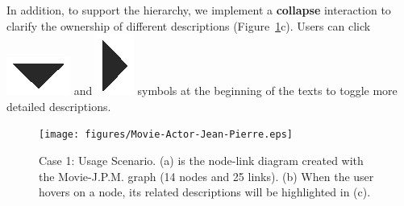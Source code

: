 In addition, to support the hierarchy, we implement a \textbf{collapse} interaction to clarify the ownership of different descriptions (Figure~\ref{fig:Movie-Actor-Jean-Pierre}c). Users can click \includegraphics[height=0.8\baselineskip]{figures/collapse-symbol-1.eps} and \includegraphics[height=0.8\baselineskip]{figures/collapse-symbol-2.eps} symbols at the beginning of the texts to toggle more detailed descriptions.



\begin{figure}[tp]
    \centering
    \setlength{\belowcaptionskip}{-10pt}
    \texttt{[image: figures/Movie-Actor-Jean-Pierre.eps]}
    \caption{Case 1: Usage Scenario. (a) is the node-link diagram created with the Movie-J.P.M. graph (14 nodes and 25 links). (b) When the user hovers on a node, its related descriptions will be highlighted in (c).}
    \label{fig:Movie-Actor-Jean-Pierre}
\end{figure}